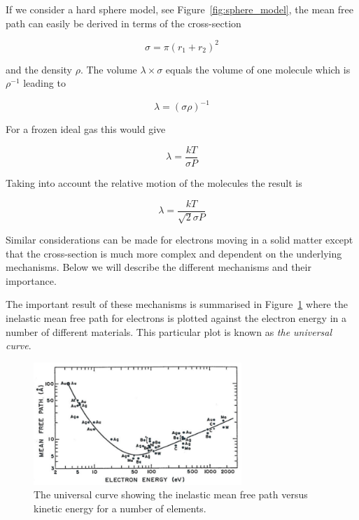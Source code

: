 If we consider a hard sphere model, see Figure~\ref{fig:sphere_model}, the mean free path can easily be derived in terms of the cross-section

\begin{equation}
\sigma =\pi (r_1+r_2)^2
\end{equation}

\noindent and the density $\rho$. The volume $\lambda \times \sigma$ equals the volume of one molecule which is $\rho^{-1}$ leading to

\begin{equation}
\lambda =(\sigma \rho)^{-1}
\end{equation}

For a frozen ideal gas this would give

\begin{equation}
\lambda =\frac{kT}{\sigma P}
\end{equation}

Taking into account the relative motion of the molecules the result is

\begin{equation}
\lambda =\frac{kT}{\sqrt{2}\sigma P}
\end{equation}

Similar considerations can be made for electrons moving in a solid matter except that the cross-section is much more complex and dependent on the underlying mechanisms. Below we will describe the different mechanisms and their importance.

The important result of these mechanisms is summarised in Figure~\ref{fig:mean_free_path} where the inelastic mean free path for electrons is plotted against the electron energy in a number of different materials. This particular plot is known as \emph{the universal curve}.

\begin{figure}[htbp]
\centering
\includegraphics[width=0.7\textwidth]{figures/02_06}
\caption{The universal curve showing the inelastic mean free path versus kinetic energy for a number of elements.}
\label{fig:mean_free_path}
\end{figure}

